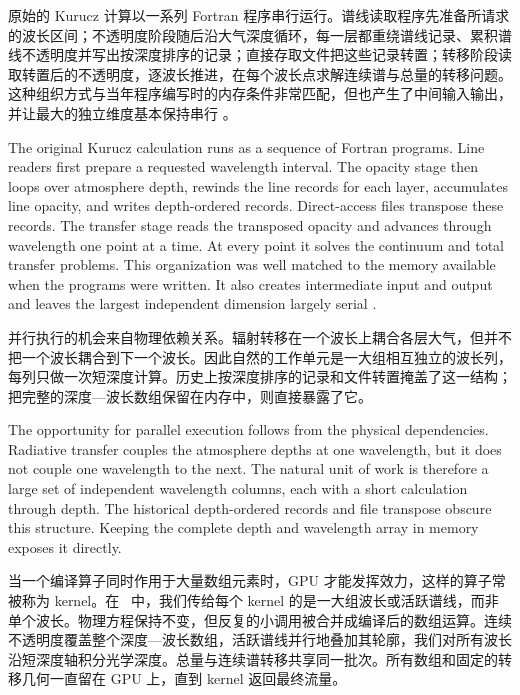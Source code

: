 原始的 Kurucz 计算以一系列 Fortran 程序串行运行。谱线读取程序先准备所请求的波长区间；不透明度阶段随后沿大气深度循环，每一层都重绕谱线记录、累积谱线不透明度并写出按深度排序的记录；直接存取文件把这些记录转置；转移阶段读取转置后的不透明度，逐波长推进，在每个波长点求解连续谱与总量的转移问题。这种组织方式与当年程序编写时的内存条件非常匹配，但也产生了中间输入输出，并让最大的独立维度基本保持串行 \citep{Kurucz2005}。

\begin{EN}
The original Kurucz calculation runs as a sequence of Fortran programs. Line
readers first prepare a requested wavelength interval. The opacity stage then
loops over atmosphere depth, rewinds the line records for each layer,
accumulates line opacity, and writes depth-ordered records. Direct-access files
transpose these records. The transfer stage reads the transposed opacity and
advances through wavelength one point at a time. At every point it solves the
continuum and total transfer problems. This organization was well
matched to the memory available when the programs were written. It also
creates intermediate input and output and leaves the largest independent
dimension largely serial \citep{Kurucz2005}.
\end{EN}

并行执行的机会来自物理依赖关系。辐射转移在一个波长上耦合各层大气，但并不把一个波长耦合到下一个波长。因此自然的工作单元是一大组相互独立的波长列，每列只做一次短深度计算。历史上按深度排序的记录和文件转置掩盖了这一结构；把完整的深度—波长数组保留在内存中，则直接暴露了它。

\begin{EN}
The opportunity for parallel execution follows from the physical dependencies.
Radiative transfer couples the atmosphere depths at one wavelength, but it does
not couple one wavelength to the next. The natural unit of work is therefore a
large set of independent wavelength columns, each with a short calculation
through depth. The historical depth-ordered records and file transpose obscure
this structure. Keeping the complete depth and wavelength array in memory
exposes it directly.
\end{EN}

当一个编译算子同时作用于大量数组元素时，GPU 才能发挥效力，这样的算子常被称为 kernel。在 \paynezero\ 中，我们传给每个 kernel 的是一大组波长或活跃谱线，而非单个波长。物理方程保持不变，但反复的小调用被合并成编译后的数组运算。连续不透明度覆盖整个深度—波长数组，活跃谱线并行地叠加其轮廓，我们对所有波长沿短深度轴积分光学深度。总量与连续谱转移共享同一批次。所有数组和固定的转移几何一直留在 GPU 上，直到 kernel 返回最终流量。

